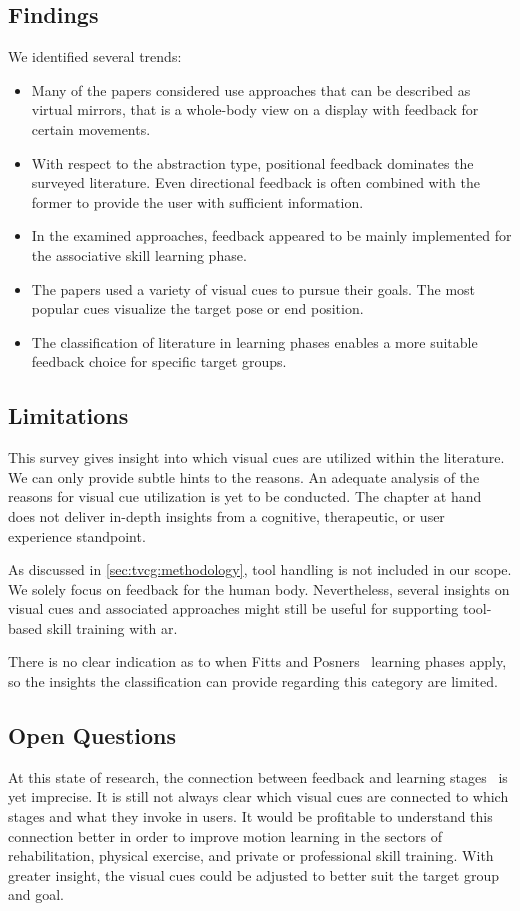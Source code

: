 \subsection{Findings}
We identified several trends:
\begin{itemize}
    \setlength{\itemsep}{-0.3cm}
    \item Many of the papers considered use approaches that can be described as virtual mirrors, that is a whole-body view on a display with feedback for certain movements.
    \item With respect to the abstraction type, positional feedback dominates the surveyed literature. Even directional feedback is often combined with the former to provide the user with sufficient information.
    \item In the examined approaches, feedback appeared to be mainly implemented for the associative skill learning phase.
    \item The papers used a variety of visual cues to pursue their goals. The most popular cues visualize the target pose or end position.
    \item The classification of literature in learning phases enables a more suitable feedback choice for specific target groups.
\end{itemize}

\subsection{Limitations}
This survey gives insight into which visual cues are utilized within the literature. We can only provide subtle hints to the reasons. An adequate analysis of the reasons for visual cue utilization is yet to be conducted. The chapter at hand does not deliver in-depth insights from a cognitive, therapeutic, or user experience standpoint.

As discussed in \autoref{sec:tvcg:methodology}, tool handling is not included in our scope. We solely focus on feedback for the human body. Nevertheless, several insights on visual cues and associated approaches might still be useful for supporting tool-based skill training with \acrshort{ar}.

There is no clear indication as to when Fitts and Posners~\cite{fitts1967HPe} learning phases apply, so the insights the classification can provide regarding this category are limited.

\subsection{Open Questions \label{sec:futureWork}}
At this state of research, the connection between feedback and learning stages~\cite{fitts1967HPe} is yet imprecise. It is still not always clear which visual cues are connected to which stages and what they invoke in users. It would be profitable to understand this connection better in order to improve motion learning in the sectors of rehabilitation, physical exercise, and private or professional skill training. With greater insight, the visual cues could be adjusted to better suit the target group and goal.

